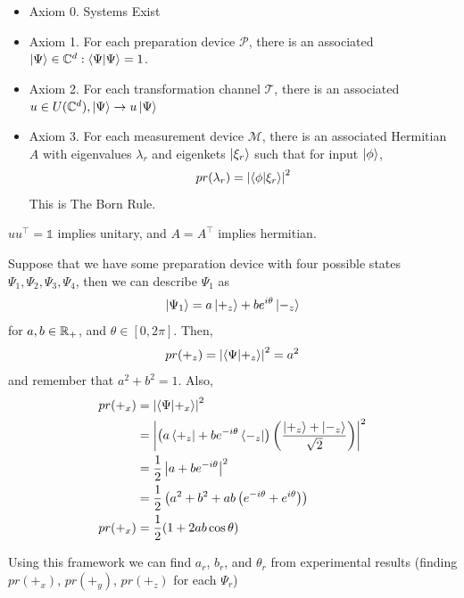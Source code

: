 \documentclass[english, 11pt]{article}
\begin{document}
      \begin{itemize}
        \item Axiom 0. Systems Exist
        \item Axiom 1. For each preparation device $\mathcal{P}$, there is an associated $\ket{\Psi} \in \C^d : \braket{\Psi}{\Psi} = 1$.
        \item Axiom 2. For each transformation channel $\mathcal{T}$, there is an associated $u \in U({\mathbb{C}}^d), \left|\Psi\right\rangle \rightarrow u\left|\Psi\right\rangle$
        \item Axiom 3. For each measurement device $\mathcal{M}$, there is an associated Hermitian $A$ with eigenvalues $\lambda_r$ and eigenkets $\left|\xi_r\right\rangle$ such that for input $\left|\phi\right\rangle$,
        \[ pr(\lambda_r) = \left| \braket{\phi}{\xi_r}\right|^2 \]
        This is The Born Rule.
      \end{itemize}

      \begin{note}
        $uu^\intercal = \mathbb{1}$ implies unitary, and $A = A^\intercal$ implies hermitian.
      \end{note}

      \begin{exmp}
        Suppose that we have some preparation device with four possible states $\Psi_1, \Psi_2, \Psi_3, \Psi_4$, then we can describe $\Psi_1$ as
        \[ \left|\Psi_1\right\rangle = a\left|+_z\right\rangle + be^{i\theta}\left|-_z\right\rangle \]
        for $a, b \in {\mathbb{R}}_+$, and $\theta \in [0, 2\pi]$. Then,
        \[ pr(+_z) = \left|\braket{\Psi}{+_z}\right|^2 = a^2\]
        and remember that $a^2 + b^2 = 1$. Also,
        \begin{align*}
          pr(+_x) & = \left| \braket{\Psi}{+_x} \right|^2 \\
                  & = \left| \left( a \bra{+_z}+be^{-i\theta}\bra{-_z} \right) \left( \f{\ket{+_z} + \ket{-_z}}{\sqrt{2}} \right) \right|^2 \\
                  & = \f{1}{2} \left| a + be^{-i\theta} \right|^2 \\
                  & = \f{1}{2} \left( a^2 + b^2 + ab \left( e^{-i\theta} + e^{i\theta} \right) \right) \\
          pr(+_x) & = \f{1}{2} (1 + 2ab\cos\theta)
        \end{align*}

        Using this framework we can find $a_r$, $b_r$, and $\theta_r$ from experimental results (finding $pr(+_x)$, $pr(+_y)$, $pr(+_z)$ for each $\Psi_r$)
      \end{exmp}
\end{document}
